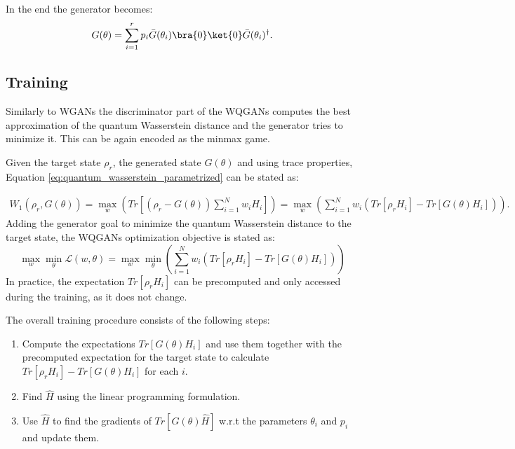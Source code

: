 In the end the generator becomes:
\begin{equation}
  G(\theta) = \sum_{i=1}^r p_i\bar{G}(\theta_i)\bra{0}\ket{0}\bar{G}(\theta_i)^\dagger.
\end{equation}



\subsection{Training}
Similarly to WGANs the discriminator part of the WQGANs computes the best
approximation of the quantum Wasserstein distance and the generator tries to
minimize it. This can be again encoded as the minmax game.

Given the target state $\rho_r$, the generated state $G(\theta)$ and using trace
properties, Equation \eqref{eq:quantum_wasserstein_parametrized} can be stated as:

\begin{equation}
  \label{eq:quantum_wasserstein_separated_trace}
  \begin{split}
    W_1(\rho_r, G(\theta)) = \max_{w}{(Tr[(\rho_r - G(\theta))\sum_{i=1}^N w_iH_i])} = \max_{w}{(\sum_{i=1}^Nw_i(Tr[\rho_rH_i] - Tr[G(\theta)H_i]))}.
  \end{split}
\end{equation}
Adding the generator goal to minimize the quantum Wasserstein distance to the target
state, the WQGANs optimization objective is stated as:
\begin{equation}
  \max_{w}{\min_{\theta}{\mathcal{L}(w, \theta)}} = \max_{w}{\min_{\theta}{(\sum_{i=1}^Nw_i(Tr[\rho_rH_i] - Tr[G(\theta)H_i]))}} 
  \label{eq:wqgans_optimization_objective}
\end{equation}
In practice, the expectation $Tr[\rho_rH_i]$ can be precomputed and only
accessed during the training, as it does not change.

The overall training procedure consists of the following steps:
\begin{enumerate}
\item Compute the expectations $Tr[G(\theta)H_i]$ and use them together with
  the precomputed expectation for the target state to calculate $Tr[\rho_rH_i] -
  Tr[G(\theta)H_i]$ for each $i$.
\item Find $\hat{H}$ using the linear programming formulation.
\item Use $\hat{H}$ to find the gradients of $Tr[G(\theta)\hat{H}]$ w.r.t the parameters
  $\theta_i$ and $p_i$ and update them.
\end{enumerate}


